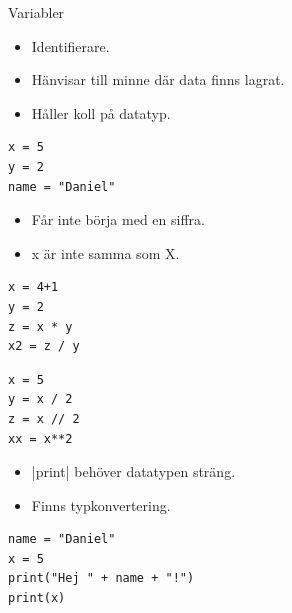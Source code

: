 \begin{frame}[fragile]
  \begin{block}{Variabler}
    \begin{itemize}
      \item Identifierare.
      \item Hänvisar till minne där data finns lagrat.
      \item Håller koll på datatyp.
    \end{itemize}
  \end{block}

  \pause

  \begin{example}[Variabler]
    \begin{verbatim}
x = 5
y = 2
name = "Daniel"
    \end{verbatim}
  \end{example}
\end{frame}

\begin{frame}
  \begin{remark}
    \begin{itemize}
      \item Får inte börja med en siffra.
      \item x är inte samma som X.
    \end{itemize}
  \end{remark}
\end{frame}

\begin{frame}[fragile]
  \begin{example}[Heltalsoperationer]
    \begin{verbatim}
x = 4+1
y = 2
z = x * y
x2 = z / y
    \end{verbatim}
  \end{example}
\end{frame}

\begin{frame}[fragile]
  \begin{example}
    \begin{verbatim}
x = 5
y = x / 2
z = x // 2
xx = x**2
    \end{verbatim}
  \end{example}
\end{frame}

\begin{frame}[fragile]
  \begin{remark}
    \begin{itemize}
      \item {}|print| behöver datatypen sträng.
      \item Finns typkonvertering.
    \end{itemize}
  \end{remark}

  \begin{example}
    \begin{verbatim}
name = "Daniel"
x = 5
print("Hej " + name + "!")
print(x)
    \end{verbatim}
  \end{example}
\end{frame}

